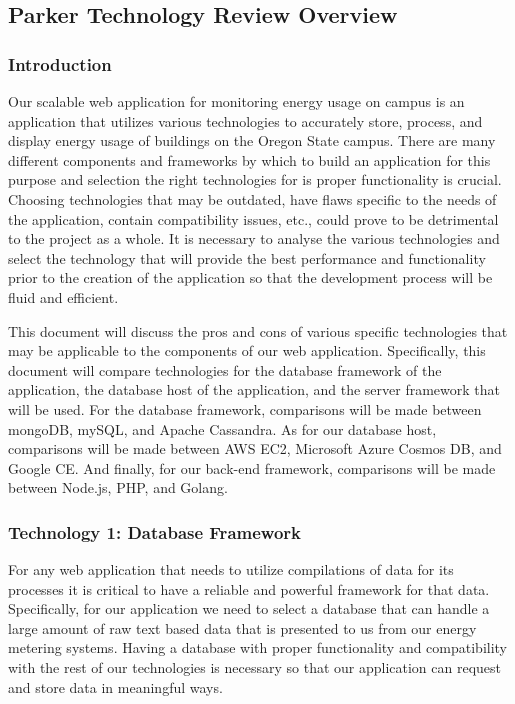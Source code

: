 \subsection{Parker Technology Review Overview}


\subsubsection{Introduction}
	
	Our scalable web application for monitoring energy usage on campus is an application that utilizes various technologies to accurately store, process, and display
	energy usage of buildings on the Oregon State campus. There are many different components and frameworks by which to build an application for this purpose and
	selection the right technologies for is proper functionality is crucial. Choosing technologies that may be outdated, have flaws specific to the needs of the application, contain
	compatibility issues, etc., could prove to be detrimental to the project as a whole. It is necessary to analyse the various technologies and select
	the technology that will provide the best performance and functionality prior to the creation of the application so that the development process will be fluid and efficient. 
	
	This document will discuss the pros and cons of various specific technologies that may be applicable to the components of our web application. Specifically, this
	document will compare technologies for the database framework of the application, the database host of the application, and the server framework that will be used.
	For the database framework, comparisons will be made between mongoDB, mySQL, and Apache Cassandra. As for our database host, comparisons will be made between AWS EC2, Microsoft Azure Cosmos DB, and Google CE.
	And finally, for our back-end framework, comparisons will be made between Node.js, PHP, and Golang.


\subsubsection{Technology 1: Database Framework}

	For any web application that needs to utilize compilations of data for its processes it is critical to have a reliable and 
	powerful framework for that data. Specifically, for our application we need to select a database that can handle a large amount
	of raw text based data that is presented to us from our energy metering systems. Having a database with proper functionality and
	compatibility with the rest of our technologies is necessary so that our application can request and store data in meaningful ways. 
	
